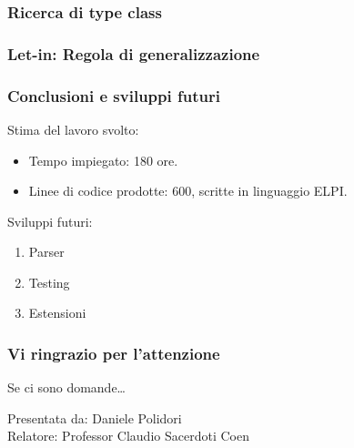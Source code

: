 \documentclass{beamer}
\begin{document}
\begin{frame}

 \frametitle{Ricerca di type class}


\end{frame}


\begin{frame}

 \frametitle{Let-in: Regola di generalizzazione}


\end{frame}


\begin{frame}

 \frametitle{Conclusioni e sviluppi futuri}

 Stima del lavoro svolto:
 \begin{itemize}
  \item Tempo impiegato: 180 ore.
  \item Linee di codice prodotte: 600, scritte in linguaggio ELPI.
 \end{itemize}

 \vfill

 Sviluppi futuri:
 \begin{enumerate}
  \item Parser
  \item Testing
  \item Estensioni
 \end{enumerate}

\end{frame}


\begin{frame}

 \frametitle{Vi ringrazio per l'attenzione}

 Se ci sono domande\ldots
 
 \vfill
 \begin{flushright}
  Presentata da: Daniele Polidori\\
  Relatore: Professor Claudio Sacerdoti Coen
 \end{flushright}

\end{frame}


\begin{frame}

 \frametitle{}


\end{frame}


\begin{frame}

 \frametitle{}


\end{frame}
\end{document}
